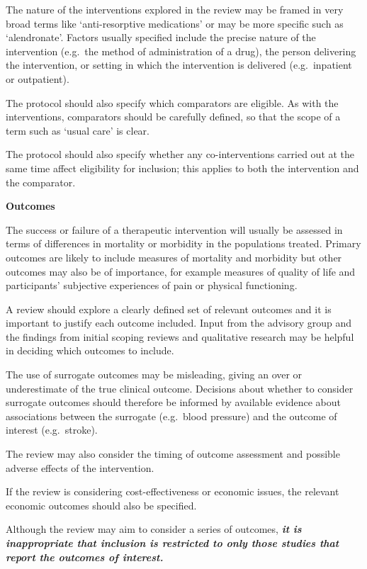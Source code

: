 \documentclass[
  10pt,
  a4paper,
  DIV=11,
  numbers=noendperiod]{scrreprt}
\begin{document}
The nature of the interventions explored in the review may be framed in
very broad terms like `anti-resorptive medications' or may be more
specific such as `alendronate'. Factors usually specified include the
precise nature of the intervention (e.g.~the method of administration of
a drug), the person delivering the intervention, or setting in which the
intervention is delivered (e.g.~inpatient or outpatient).

The protocol should also specify which comparators are eligible. As with
the interventions, comparators should be carefully defined, so that the
scope of a term such as `usual care' is clear.

The protocol should also specify whether any co-interventions carried
out at the same time affect eligibility for inclusion; this applies to
both the intervention and the comparator.

\textbf{Outcomes}

The success or failure of a therapeutic intervention will usually be
assessed in terms of differences in mortality or morbidity in the
populations treated. Primary outcomes are likely to include measures of
mortality and morbidity but other outcomes may also be of importance,
for example measures of quality of life and participants' subjective
experiences of pain or physical functioning.

A review should explore a clearly defined set of relevant outcomes and
it is important to justify each outcome included. Input from the
advisory group and the findings from initial scoping reviews and
qualitative research may be helpful in deciding which outcomes to
include.

The use of surrogate outcomes may be misleading, giving an over or
underestimate of the true clinical outcome. Decisions about whether to
consider surrogate outcomes should therefore be informed by available
evidence about associations between the surrogate (e.g.~blood pressure)
and the outcome of interest (e.g.~stroke).

The review may also consider the timing of outcome assessment and
possible adverse effects of the intervention.

If the review is considering cost-effectiveness or economic issues, the
relevant economic outcomes should also be specified.

Although the review may aim to consider a series of outcomes,
\textbf{\emph{it is inappropriate that inclusion is restricted to only
those studies that report the outcomes of interest.}}
\end{document}
